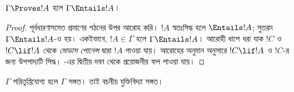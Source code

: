 \documentclass[../../../include/open-logic-section]{subfiles}
\begin{document}


\begin{thm}[বিশুদ্ধতা]
$\Gamma\Proves!A$ হলে
$\Gamma \Entails !A$।
\end{thm}

\begin{proof}
পূর্বধারণাসমেত প্রমাণের গঠনের উপর আরোহ করি।
$!A$ স্বতঃসিদ্ধ হলে $\Entails !A$; সুতরাং $\Gamma \Entails!A$-ও হয়।
একইভাবে, $!A \in \Gamma$ হলে $\Gamma \Entails!A$।
আরোহী ধাপে ধরা যাক $!C$ ও $!C\lif!A$ থেকে
\emph{মোডাস পোনেন্স} দ্বারা $!A$ পাওয়া যায়। আরোহের অনুমান অনুসারে
$!C\lif !A$ ও $!C$-র জন্য উপপাদ্যটি সিদ্ধ।
-এর দ্বিতীয় দফা থেকে
প্রয়োজনীয় ফল পাওয়া যায়।
\end{proof}

\begin{cor}
$\Gamma$ পরিতৃপ্তিযোগ্য হলে $\Gamma$ সঙ্গত।
তাই বচনীয় যুক্তিবিদ্যা সঙ্গত।
\end{cor}
\end{document}
